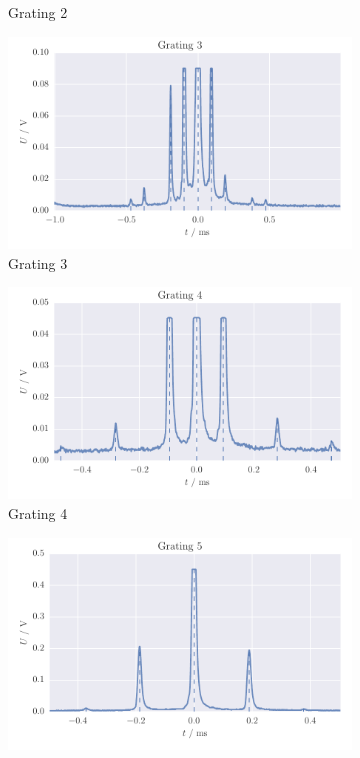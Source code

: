 \begin{figure}
\begin{subfigure}[b]{\mpltw}
        \caption{Grating 2}
        \label{fig:gratings_maxi1}
    \end{subfigure}
    \begin{subfigure}[b]{\mpltw}
        \includegraphics[width=\textwidth]{figures/gratings_maxi3.pdf}
        \caption{Grating 3}
        \label{fig:gratings_maxi1}
    \end{subfigure}\quad
    \begin{subfigure}[b]{\mpltw}
        \includegraphics[width=\textwidth]{figures/gratings_maxi4.pdf}
        \caption{Grating 4}
        \label{fig:gratings_maxi1}
    \end{subfigure}
    \begin{subfigure}[b]{\mpltw}
        \includegraphics[width=\textwidth]{figures/gratings_maxi5.pdf}

\end{subfigure}
\end{figure}
